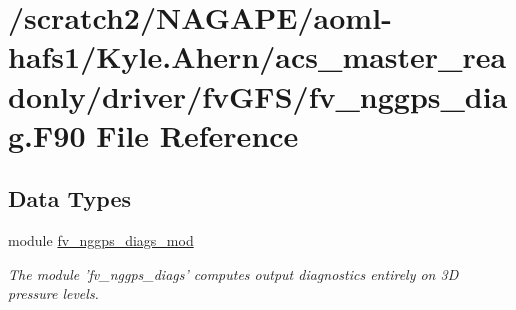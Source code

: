 \section{/scratch2/\-N\-A\-G\-A\-P\-E/aoml-\/hafs1/\-Kyle.Ahern/acs\-\_\-master\-\_\-readonly/driver/fv\-G\-F\-S/fv\-\_\-nggps\-\_\-diag.F90 File Reference}
\label{fv__nggps__diag_8F90}
\subsection*{Data Types}
\begin{DoxyCompactItemize}
\item 
module \hyperlink{classfv__nggps__diags__mod}{fv\-\_\-nggps\-\_\-diags\-\_\-mod}
\begin{DoxyCompactList}\small\item\em The module 'fv\-\_\-nggps\-\_\-diags' computes output diagnostics entirely on 3\-D pressure levels. \end{DoxyCompactList}\end{DoxyCompactItemize}
